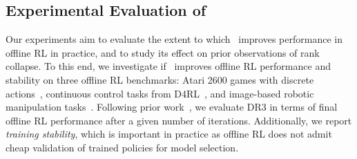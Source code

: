 

\vspace{-0.2cm}
\subsection{Experimental Evaluation of \drmethodname}
\label{sec:dr3_experiments}
\vspace{-0.2cm}
Our experiments aim to evaluate the extent to which \drmethodname\ improves performance in offline RL in practice, and to study its effect on prior observations of rank collapse. To this end, we investigate if \drmethodname\ improves offline RL performance and stability on three offline RL benchmarks: Atari 2600 games with discrete actions~\citep{agarwal2019optimistic}, continuous control tasks from D4RL~\citep{fu2020d4rl}, and image-based robotic manipulation tasks~\citep{singh2020cog}.
Following prior work~\citep{fu2020d4rl, gulcehre2020rl}, we evaluate DR3 in terms of final offline RL performance after a given number of iterations. Additionally, we report \emph{training stability}, which is important in practice as offline RL does not admit cheap validation of trained policies for model selection.
